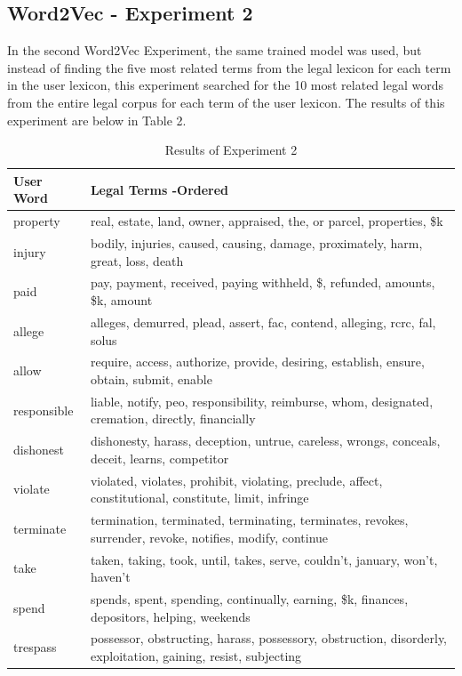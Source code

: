 \documentclass[11pt]{article}
\begin{document}
\subsection{Word2Vec - Experiment 2}
In the second Word2Vec Experiment, the same trained model was used, but instead of finding the five most related terms from the legal lexicon for each term in the user lexicon, this experiment searched for the 10 most related legal words from the entire legal corpus for each term of the user lexicon.  The results of this experiment are below in Table 2.
\begin{table}
\small
  \centering
  \caption{Results of Experiment 2}
    \begin{tabular}{|l|p{5cm}|}
    \hline
    \textbf{User Word} & \textbf{Legal Terms -Ordered} \\
    \hline
    property & real, estate, land, owner, appraised, the, or parcel, properties, \$k \\
    \hline
    injury & bodily, injuries, caused, causing, damage, proximately, harm, great, loss, death \\
    \hline
    paid  &  pay, payment, received, paying withheld, \$, refunded, amounts, \$k, amount \\
    \hline
    allege & alleges, demurred, plead, assert, fac, contend, alleging, rcrc, fal, solus \\
    \hline
    allow & require, access, authorize, provide, desiring, establish, ensure, obtain, submit, enable \\
    \hline
    responsible & liable, notify, peo, responsibility, reimburse, whom, designated, cremation, directly, financially \\
    \hline
    dishonest & dishonesty, harass, deception, untrue, careless, wrongs, conceals, deceit, learns, competitor \\
    \hline
    violate & violated, violates, prohibit, violating, preclude, affect, constitutional, constitute, limit, infringe \\
    \hline
    terminate & termination, terminated, terminating, terminates, revokes, surrender, revoke, notifies, modify, continue \\
    \hline
    take  & taken, taking, took, until, takes, serve, couldn't, january, won't, haven't \\
    \hline
    spend & spends, spent, spending, continually, earning, \$k, finances, depositors, helping, weekends \\
    \hline
    trespass & possessor, obstructing, harass, possessory, obstruction, disorderly, exploitation, gaining, resist, subjecting \\

\end{tabular}
\end{table}
\end{document}
